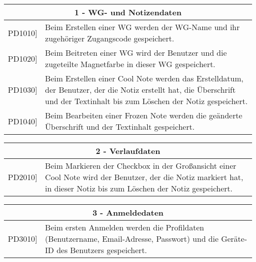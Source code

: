 \begin{flushleft}
    	\begin{table}[h!]
    		\centering
    		\label{my-label}
    		\begin{tabular}{p{2cm}p{12cm}}
    			
    			\multicolumn{2}{c}{\textbf{1 - WG- und Notizendaten}} \\ \hline
    			\centering{[}PD1010{]} & Beim Erstellen einer WG werden der WG-Name und ihr zugehöriger Zugangscode gespeichert.\\
    			\centering{[}PD1020{]}& Beim Beitreten einer WG wird der Benutzer und die zugeteilte Magnetfarbe in dieser WG gespeichert.\\
    			\centering{[}PD1030{]}& Beim Erstellen einer Cool Note werden das Erstelldatum, der Benutzer, der die Notiz erstellt hat, die Überschrift und der Textinhalt bis zum Löschen der Notiz gespeichert.\\ 
    			\centering{[}PD1040{]}& Beim Bearbeiten einer Frozen Note werden die geänderte Überschrift und der Textinhalt gespeichert.\\
    			\hline
    		\end{tabular}
    	\end{table}
    
        \vspace{5mm}
        
    	\begin{table}[h!]
    		\centering
    		\label{my-label}
    		\begin{tabular}{p{2cm}p{12cm}}
    			
    			\multicolumn{2}{c}{\textbf{2 - Verlaufdaten}} \\ \hline
    			\centering{[}PD2010{]} & Beim Markieren der Checkbox in der Großansicht einer Cool Note wird der Benutzer, der die Notiz markiert hat, in dieser Notiz bis zum Löschen der Notiz gespeichert. \\ 
    			\hline
    		\end{tabular}
    	\end{table}
    	
    	\vspace{5mm}
    	
    	\begin{table}[h!]
    		\centering
    		\label{my-label}
    		\begin{tabular}{p{2cm}p{12cm}}
    			
    			\multicolumn{2}{c}{\textbf{3 - Anmeldedaten}} \\ \hline
    			\centering{[}PD3010{]} & Beim ersten Anmelden werden die Profildaten (Benutzername, Email-Adresse, Passwort) und die Geräte-ID des Benutzers gespeichert.\\ 
    			\hline
    		\end{tabular}
    	\end{table}
\end{flushleft}
